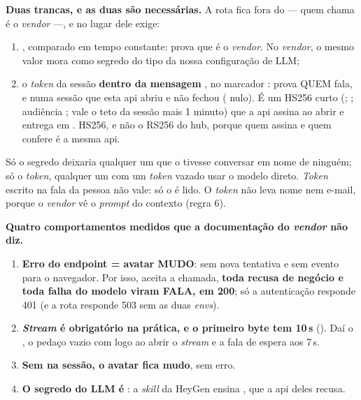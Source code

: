 \begin{regra}
\textbf{Duas trancas, e as duas são necessárias.} A rota fica fora do
 --- quem chama é o \emph{vendor} ---, e no lugar dele exige:
\begin{enumerate}
  \item {} , comparado em tempo
    constante: prova que é o \emph{vendor}. No \emph{vendor}, o mesmo valor mora
    como segredo do tipo  da nossa configuração de LLM;
  \item o \emph{token} da sessão \textbf{dentro da mensagem }, no
    marcador : prova QUEM fala, e numa sessão que esta api
    abriu e não fechou ( nulo). É um HS256 curto
    (; ; audiência
    ; vale o teto da sessão mais 1 minuto) que a api assina ao
    abrir e entrega em . HS256, e não o RS256 do
    hub, porque quem assina e quem confere é a mesma api.
\end{enumerate}
Só o segredo deixaria qualquer um que o tivesse conversar em nome de ninguém; só
o \emph{token}, qualquer um com um \emph{token} vazado usar o modelo direto.
\emph{Token} escrito na fala da pessoa não vale: só o  é lido. O
\emph{token} não leva nome nem e-mail, porque o \emph{vendor} vê o \emph{prompt}
do contexto (regra 6).
\end{regra}

\begin{atencao}
\textbf{Quatro comportamentos medidos que a documentação do \emph{vendor} não
diz.}
\begin{enumerate}
  \item \textbf{Erro do endpoint = avatar MUDO}: sem nova tentativa e sem evento
    para o navegador. Por isso, aceita a chamada, \textbf{toda recusa de negócio
    e toda falha do modelo viram FALA, em 200}; só a autenticação responde 401
    (e a rota responde 503 sem as duas \emph{envs}).
  \item \textbf{\emph{Stream} é obrigatório na prática, e o primeiro byte tem
    10\,s} (). Daí o , o
    pedaço vazio com  logo ao abrir o \emph{stream} e a
    fala de espera aos 7\,s.
  \item \textbf{Sem  na sessão, o avatar fica mudo}, sem erro.
  \item \textbf{O segredo do LLM é }: a
    \emph{skill} da HeyGen ensina , que a api deles recusa.
\end{enumerate}
\end{atencao}

